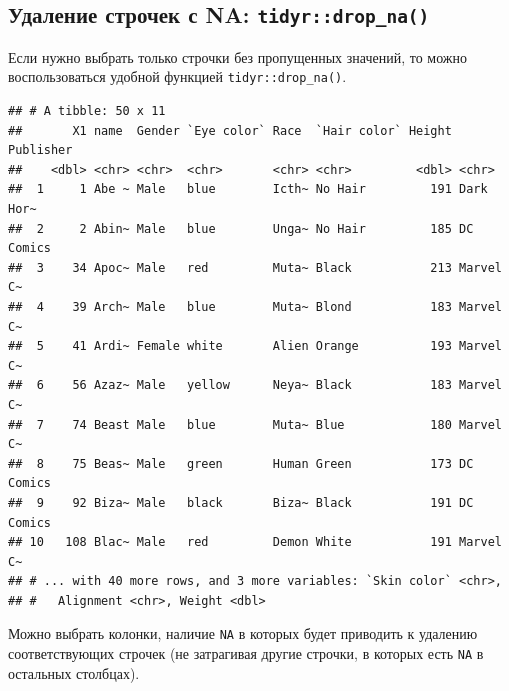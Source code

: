 \documentclass[
]{book}
\newenvironment{Shaded}{\begin{snugshade}}{\end{snugshade}}
\newcommand{\KeywordTok}[1]{\textcolor[rgb]{0.13,0.29,0.53}{\textbf{#1}}}
\newcommand{\NormalTok}[1]{#1}
\newcommand{\OperatorTok}[1]{\textcolor[rgb]{0.81,0.36,0.00}{\textbf{#1}}}
\newcommand{\StringTok}[1]{\textcolor[rgb]{0.31,0.60,0.02}{#1}}
\begin{document}
\hypertarget{tidy_drop_na}{%
\subsection{\texorpdfstring{Удаление строчек с NA: \texttt{tidyr::drop\_na()}}{Удаление строчек с NA: tidyr::drop\_na()}}\label{tidy_drop_na}}

Если нужно выбрать только строчки без пропущенных значений, то можно воспользоваться удобной функцией \texttt{tidyr::drop\_na()}.

\begin{Shaded}
\end{Shaded}

\begin{verbatim}
## # A tibble: 50 x 11
##       X1 name  Gender `Eye color` Race  `Hair color` Height Publisher
##    <dbl> <chr> <chr>  <chr>       <chr> <chr>         <dbl> <chr>    
##  1     1 Abe ~ Male   blue        Icth~ No Hair         191 Dark Hor~
##  2     2 Abin~ Male   blue        Unga~ No Hair         185 DC Comics
##  3    34 Apoc~ Male   red         Muta~ Black           213 Marvel C~
##  4    39 Arch~ Male   blue        Muta~ Blond           183 Marvel C~
##  5    41 Ardi~ Female white       Alien Orange          193 Marvel C~
##  6    56 Azaz~ Male   yellow      Neya~ Black           183 Marvel C~
##  7    74 Beast Male   blue        Muta~ Blue            180 Marvel C~
##  8    75 Beas~ Male   green       Human Green           173 DC Comics
##  9    92 Biza~ Male   black       Biza~ Black           191 DC Comics
## 10   108 Blac~ Male   red         Demon White           191 Marvel C~
## # ... with 40 more rows, and 3 more variables: `Skin color` <chr>,
## #   Alignment <chr>, Weight <dbl>
\end{verbatim}

Можно выбрать колонки, наличие \texttt{NA} в которых будет приводить к удалению соответствующих строчек (не затрагивая другие строчки, в которых есть \texttt{NA} в остальных столбцах).

\begin{Shaded}
\end{Shaded}
\end{document}
